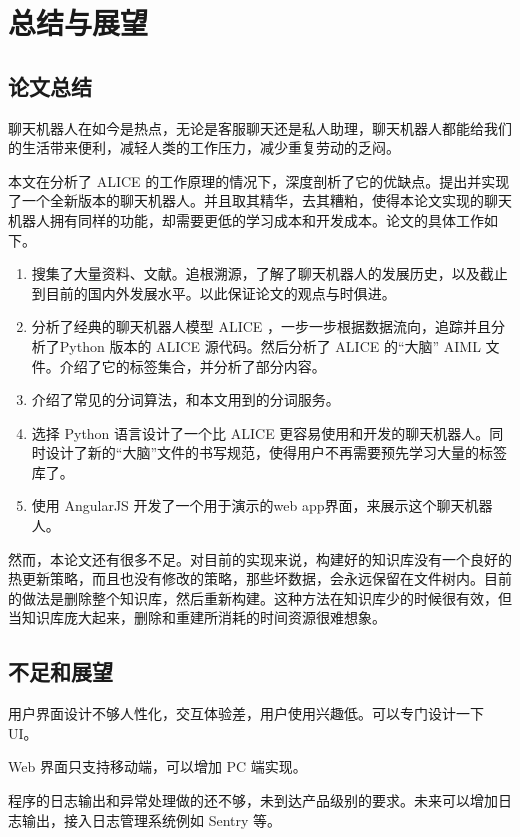 \documentclass[bachelor,winfonts]{jnuthesis}
\begin{document}
\chapter{总结与展望}
\section{论文总结}

聊天机器人在如今是热点，无论是客服聊天还是私人助理，聊天机器人都能给我们的生活带来便利，减轻人类的工作压力，减少重复劳动的乏闷。

本文在分析了 ALICE 的工作原理的情况下，深度剖析了它的优缺点。提出并实现了一个全新版本的聊天机器人。并且取其精华，去其糟粕，使得本论文实现的聊天机器人拥有同样的功能，却需要更低的学习成本和开发成本。论文的具体工作如下。

\begin{enumerate}
\item 搜集了大量资料、文献。追根溯源，了解了聊天机器人的发展历史，以及截止到目前的国内外发展水平。以此保证论文的观点与时俱进。
\item 分析了经典的聊天机器人模型 ALICE ，一步一步根据数据流向，追踪并且分析了Python 版本的 ALICE 源代码。然后分析了 ALICE 的“大脑” AIML 文件。介绍了它的标签集合，并分析了部分内容。
\item 介绍了常见的分词算法，和本文用到的分词服务。
\item 选择 Python 语言设计了一个比 ALICE 更容易使用和开发的聊天机器人。同时设计了新的“大脑”文件的书写规范，使得用户不再需要预先学习大量的标签库了。
\item 使用 AngularJS 开发了一个用于演示的web app界面，来展示这个聊天机器人。
\end{enumerate}

然而，本论文还有很多不足。对目前的实现来说，构建好的知识库没有一个良好的热更新策略，而且也没有修改的策略，那些坏数据，会永远保留在文件树内。目前的做法是删除整个知识库，然后重新构建。这种方法在知识库少的时候很有效，但当知识库庞大起来，删除和重建所消耗的时间资源很难想象。

\section{不足和展望}

用户界面设计不够人性化，交互体验差，用户使用兴趣低。可以专门设计一下 UI。

Web 界面只支持移动端，可以增加 PC 端实现。

程序的日志输出和异常处理做的还不够，未到达产品级别的要求。未来可以增加日志输出，接入日志管理系统例如 Sentry 等。
\end{document}

